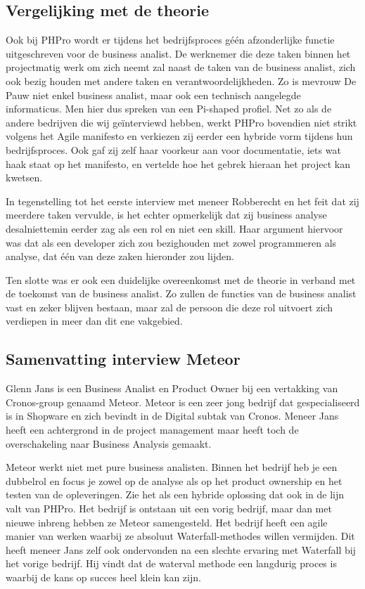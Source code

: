 \documentclass{hogent-article}
\begin{document}
\subsection{Vergelijking met de theorie}

Ook bij PHPro wordt er tijdens het bedrijfsproces géén afzonderlijke functie uitgeschreven voor de business analist. De werknemer die deze taken binnen het projectmatig werk om zich neemt zal naast de taken van de business analist, zich ook bezig houden met andere taken en verantwoordelijkheden. Zo is mevrouw De Pauw niet enkel business analist, maar ook een technisch aangelegde informaticus. Men hier dus spreken van een Pi-shaped profiel. Net zo als de andere bedrijven die wij geïnterviewd hebben, werkt PHPro bovendien niet strikt volgens het Agile manifesto en verkiezen zij eerder een hybride vorm tijdens hun bedrijfsproces. Ook gaf zij zelf haar voorkeur aan voor documentatie, iets wat haak staat op het manifesto, en vertelde hoe het gebrek hieraan het project kan kwetsen.  

In tegenstelling tot het eerste interview met meneer Robberecht en het feit dat zij meerdere taken vervulde, is het echter opmerkelijk dat zij business analyse desalniettemin eerder zag als een rol en niet een skill. Haar argument hiervoor was dat als een developer zich zou bezighouden met zowel programmeren als analyse, dat één van deze zaken hieronder zou lijden.

Ten slotte was er ook een duidelijke overeenkomst met de theorie in verband met de toekomst van de business analist. Zo zullen de functies van de business analist vast en zeker blijven bestaan, maar zal de persoon die deze rol uitvoert zich verdiepen in meer dan dit ene vakgebied.

\subsection{ Samenvatting interview Meteor}

Glenn Jans is een Business Analist en Product Owner bij een vertakking van Cronos-group genaamd Meteor. Meteor is een zeer jong bedrijf dat gespecialiseerd is in Shopware en zich bevindt in de Digital subtak van Cronos. Meneer Jans heeft een achtergrond in de project management maar heeft toch de overschakeling naar Business Analysis gemaakt. 

Meteor werkt niet met pure business analisten. Binnen het bedrijf heb je een dubbelrol en focus je zowel op de analyse als op het product ownership en het testen van de opleveringen. Zie het als een hybride oplossing dat ook in de lijn valt van PHPro. Het bedrijf is ontstaan uit een vorig bedrijf, maar dan met nieuwe inbreng hebben ze Meteor samengesteld. Het bedrijf heeft een agile manier van werken waarbij ze absoluut Waterfall-methodes willen vermijden. Dit heeft meneer Jans zelf ook ondervonden na een slechte ervaring met Waterfall bij het vorige bedrijf. Hij vindt dat de waterval methode een langdurig proces is waarbij de kans op succes heel klein kan zijn. 
\end{document}
